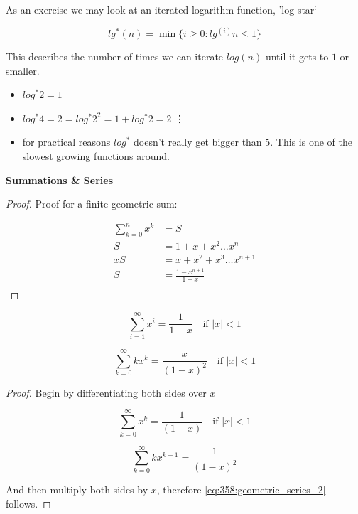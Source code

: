\documentclass[10pt]{article}
\begin{document}
As an exercise we may look at an iterated logarithm function, 'log star`

\begin{equation}
	lg^*(n) = \min\{ i \ge  0 : lg^{(i)} n \le  1 \}
	\label{eq:358:iterated_logarithm}
\end{equation}

This describes the number of times we can iterate $ log(n) $ until it gets to $ 1 $ or smaller.

\begin{itemize}
	\item $ log^*2 = 1 $ 
	\item $ log^*4 = 2 = log^*2^2 = 1 + log^*2 = 2 $ 
		\vdots
	\item for practical reasons $ log^* $  doesn't really get bigger than $ 5 $. This is one of the slowest growing functions around.
\end{itemize}


\textbf{Summations \& Series} 

\begin{proof}

	Proof for a finite geometric sum:

	\begin{equation}
		\begin{split}
			\sum^n_{k=0} x^k &= S \\
			 S &= 1 + x + x^2 \ldots x^n  \\
			 xS &= x + x^2 + x^3 \ldots x^{n+1} \\
			 S &= \frac{1-x^{n+1}}{1-x} \\
		\end{split}
	\end{equation}
\end{proof}


\begin{equation}
	\sum^\infty_{i=1} x^i = \frac{1}{1-x} \quad \text{if } |x| < 1
	\label{eq:358:decreasing_geometric_series}
\end{equation}

\begin{equation}
	\sum^\infty_{k=0} kx^k = \frac{x}{(1-x)^2} \quad \text{if } |x| < 1
	\label{eq:358:geometric_series_2}
\end{equation}

\begin{proof}

	Begin by differentiating both sides over $ x $ 

	\begin{equation}
		\sum^\infty_{k=0} x^k = \frac{1}{(1-x)} \quad \text{if } |x| < 1
	\end{equation}

	\begin{equation}
		\sum^{\infty}_{k=0} kx^{k-1} = \frac{1}{(1-x)^2}
	\end{equation}

	And then multiply both sides by $ x $, therefore \eqref{eq:358:geometric_series_2} follows.
\end{proof}
\end{document}
